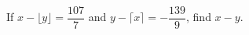 If $x - \lfloor y \rfloor = \dfrac{107}{7}$ and $y - \lceil x \rceil = - \dfrac{139}{9}$, find $x-y$.
